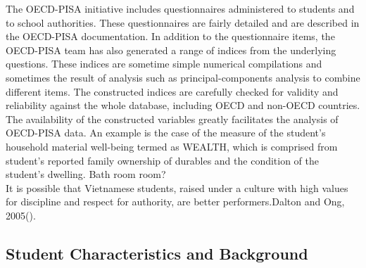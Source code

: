 \documentclass[12pt]{article}%
\begin{document}
The OECD-PISA initiative includes questionnaires administered to students and to school authorities. These questionnaires are fairly detailed and are described in the OECD-PISA documentation. In addition to the questionnaire items, the OECD-PISA team has also generated a range of indices from the underlying questions. These indices are sometime simple numerical compilations and sometimes the result of analysis such as principal-components analysis to combine different items. The constructed indices are carefully checked for validity and reliability against the whole database, including OECD and non-OECD countries. The availability of the constructed variables greatly facilitates the analysis of OECD-PISA data. An example is the case of the measure of the student's household material well-being termed as WEALTH, which is comprised from student's reported family ownership of durables and the condition of the student's dwelling. Bath room room?\\
It is possible that Vietnamese students, raised under a culture with high values for discipline and respect for authority, are better performers.Dalton and Ong, 2005(\cite{DaltonOng05}).

\subsection{Student Characteristics and Background}
\end{document}
